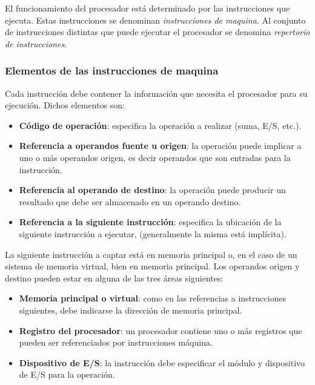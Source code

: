 El funcionamiento del procesador está determinado por las instrucciones que ejecuta. Estas instrucciones se denominan \textit{instrucciones de maquina}. Al conjunto de instrucciones distintas que puede ejecutar el procesador se denomina \textit{repertorio de instrucciones}.

\begin{subs}
  \subsubsection{Elementos de las instrucciones de maquina}

  Cada instrucción debe contener la información que necesita el procesador para su ejecución. Dichos elementos son:

  \begin{itemize}
    \item \textbf{Código de operación}: especifica la operación a realizar (suma, E/S, etc.).
    \item \textbf{Referencia a operandos fuente u origen}: la operación puede implicar a uno o más operandos origen, es decir operandos que son entradas para la instrucción.
    \item \textbf{Referencia al operando de destino}: la operación puede producir un resultado que debe ser almacenado en un operando destino.
    \item \textbf{Referencia a la siguiente instrucción}: especifica la ubicación de la siguiente instrucción a ejecutar, (generalmente la misma está implícita).
  \end{itemize}

  La siguiente instrucción a captar está en memoria principal o, en el caso de un sistema de memoria virtual, bien en memoria principal.
  Los operandos origen y destino pueden estar en alguna de las tres áreas siguientes:

  \begin{itemize}
    \item \textbf{Memoria principal o virtual}: como en las referencias a instrucciones siguientes, debe indicarse la dirección de memoria principal.
    \item \textbf{Registro del procesador}: un procesador contiene uno o más registros que pueden ser referenciados por instrucciones máquina.
    \item \textbf{Dispositivo de E/S}: la instrucción debe especificar el módulo y dispositivo de E/S para la operación.
  \end{itemize}


\end{subs}
